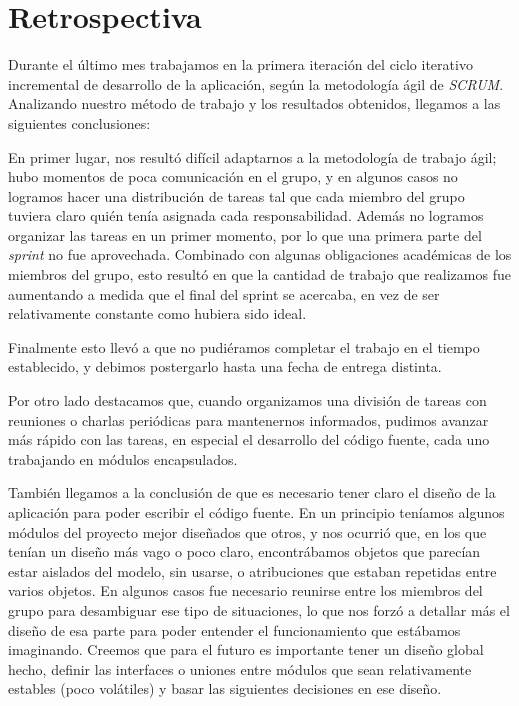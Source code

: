 \section{Retrospectiva} 


Durante el último mes trabajamos en la primera iteración del ciclo iterativo incremental de desarrollo de la aplicación, según la metodología ágil de \emph{SCRUM}. Analizando nuestro método de trabajo y los resultados obtenidos, llegamos a las siguientes conclusiones:

En primer lugar, nos resultó difícil adaptarnos a la metodología de trabajo ágil; hubo momentos de poca comunicación en el grupo, y en algunos casos no logramos hacer una distribución de tareas tal que cada miembro del grupo tuviera claro quién tenía asignada cada responsabilidad. Además no logramos organizar las tareas en un primer momento, por lo que una primera parte del \emph{sprint} no fue aprovechada. Combinado con algunas obligaciones académicas de los miembros del grupo, esto resultó en que la cantidad de trabajo que realizamos fue aumentando a medida que el final del sprint se acercaba, en vez de ser relativamente constante como hubiera sido ideal.

Finalmente esto llevó a que no pudiéramos completar el trabajo en el tiempo establecido, y debimos postergarlo hasta una fecha de entrega distinta.\medskip

Por otro lado destacamos que, cuando organizamos una división de tareas con reuniones o charlas periódicas para mantenernos informados, pudimos avanzar más rápido con las tareas, en especial el desarrollo del código fuente, cada uno trabajando en módulos encapsulados.

También llegamos a la conclusión de que es necesario tener claro el diseño de la aplicación para poder escribir el código fuente. En un principio teníamos algunos módulos del proyecto mejor diseñados que otros, y nos ocurrió que, en los que tenían un diseño más vago o poco claro, encontrábamos objetos que parecían estar aislados del modelo, sin usarse, o atribuciones que estaban repetidas entre varios objetos. En algunos casos fue necesario reunirse entre los miembros del grupo para desambiguar ese tipo de situaciones, lo que nos forzó a detallar más el diseño de esa parte para poder entender el funcionamiento que estábamos imaginando. Creemos que para el futuro es importante tener un diseño global hecho, definir las interfaces o uniones entre módulos que sean relativamente estables (poco volátiles) y basar las siguientes decisiones en ese diseño.

